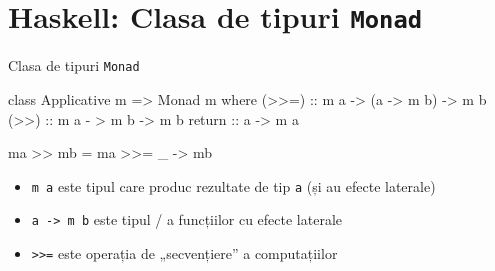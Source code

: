 \documentclass[xcolor=x11names,compress,10pt]{beamer}
\newcommand{\li}[1]{\lstinline$#1$}
\begin{document}
%



\section{Haskell: Clasa de tipuri \li{Monad}} \sectionframe

\begin{frame}[fragile]{Clasa de tipuri \li{Monad}}

\begin{asciihs}
class Applicative m => Monad m where
    (>>=) :: m a -> (a -> m b) -> m b
    (>>) :: m a - > m b -> m b 
    return :: a -> m a
    
    ma >> mb = ma >>= \_ -> mb 
\end{asciihs}



\begin{itemize}
\item \li{m a}  este  tipul  care produc rezultate de tip \li{a} (și au efecte laterale)
\item  \li{a -> m b} este tipul  / a funcțiilor cu efecte laterale

\item \li{>>=} este operația de „secvențiere” a computațiilor

\end{itemize}

\end{frame}
\end{document}
